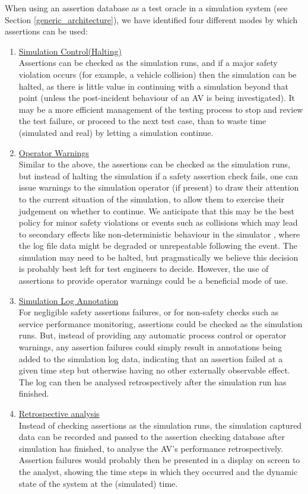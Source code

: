 When using an assertion database as a test oracle in a simulation system (see Section \ref{generic_architecture}), we have identified four different modes by which assertions can be used:
\begin{enumerate}
    \item \underline{Simulation Control(Halting)}\\
    Assertions can be checked as the simulation runs, and if a major safety violation occurs (for example, a vehicle collision) then the simulation can be halted, as there is little value in continuing with a simulation beyond that point (unless the post-incident behaviour of an AV is being investigated). It may be a more efficient management of the testing process to stop and review the test failure, or proceed to the next test case, than to waste time (simulated and real) by letting a simulation continue.
    \item \underline{Operator Warnings}\\
    Similar to the above, the assertions can be checked as the simulation runs, but instead of halting the simulation if a safety assertion check fails, one can issue warnings to the simulation operator (if present) to draw their attention to the current situation of the simulation, to allow them to exercise their judgement on whether to continue. We anticipate that this may be the best policy for minor safety violations or events such as collisions which may lead to secondary effects like non-deterministic behaviour in the simulator \cite{chance2021}, where the log file data might be degraded or unrepeatable following the event.
    The simulation may need to be halted, but pragmatically we believe this decision is probably best left for test engineers to decide. However, the use of assertions to provide operator warnings could be a beneficial mode of use.
    \item \underline{Simulation Log Annotation}\\
    For negligible safety assertions failures, or for non-safety checks such as service performance monitoring, assertions could be checked as the simulation runs. But, instead of providing any automatic process control or operator warnings, any assertion failures could simply result in annotations being added to the simulation log data, indicating that an assertion failed at a given time step but otherwise having no other externally observable effect. The log can then be analysed retrospectively after the simulation run has finished.
    \item \underline{Retrospective analysis}\\
    Instead of checking assertions as the simulation runs, the simulation captured data can be recorded and passed to the assertion checking database after simulation has finished, to analyse the AV's performance retrospectively. Assertion failures would probably then be presented in a display on screen to the analyst, showing the time steps in which they occurred and the dynamic state of the system at the (simulated) time.
\end{enumerate}

